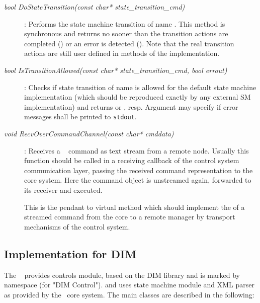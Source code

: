\begin{description}

 
\item[\em bool DoStateTransition(const char* state\_transition\_cmd)] :
Performs the state machine transition of name .
This method is synchronous and returns no sooner than the 
transition actions are completed () or an error is detected ().
Note that the real transition actions are still user defined in methods
of the  implementation.

\item[\em bool IsTransitionAllowed(const char* state\_transition\_cmd, bool errout)] :
Checks if state transition of name  is allowed
for the default state machine implementation (which should be reproduced exactly by
any external SM implementation) and returns  or , resp. Argument
 may specify if error messages shall be printed to {\tt stdout}.

\item[\em void RecvOverCommandChannel(const char* cmddata)] :
Receives a \dabc~ command as text stream  
from a remote node. Usually this function should be called in a
receiving callback of the control system communication layer,
passing the received command representation to the core system.
Here the command object is unstreamed again, forwarded to its
receiver and executed.

This is the pendant to virtual method 
 which should implement the  
of a streamed command from the core to a remote manager by transport mechanisms of the control system. 

 
 
\end{description}






\subsection{Implementation for DIM}
\label{prog_manager_controls_DIM}
The \dabc~ provides controls module, based on the DIM library \cite{DIM} and 
is marked by namespace  (for "DIM Control"). 
and uses state machine module and XML parser as provided by the \dabc~core system. 
The main classes are described in the following:


